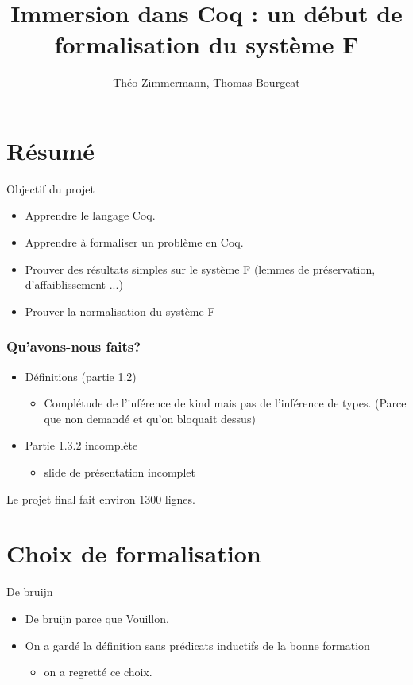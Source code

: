 \documentclass{beamer}
\begin{document}
	\title{Immersion dans Coq : un début de formalisation du système F}
	\author{Théo Zimmermann, Thomas Bourgeat}
\frame{\titlepage}
\frame{\tableofcontents}

\section{Résumé}

\begin{frame}
Objectif du projet
\begin{itemize}
\item Apprendre le langage Coq.
\pause
\item Apprendre à formaliser un problème en Coq.
\pause
\item {\scriptsize Prouver des résultats simples sur le système F (lemmes de
préservation, d'affaiblissement ...)}
\item {\tiny Prouver la normalisation du système F}
\end{itemize}


\end{frame}

    \begin{frame}
    \frametitle{Qu'avons-nous faits?}
	\begin{itemize}
	\item Définitions (partie 1.2)
	\begin{itemize}
	\item Complétude de l'inférence de kind mais pas de l'inférence
	de types. (Parce que non demandé et qu'on bloquait dessus)
	\end{itemize}
	\pause
	\item Partie 1.3.2 incomplète
	\begin{itemize}
	\item slide de présentation incomplet
	\end{itemize}
	\end{itemize}
	Le projet final fait environ 1300 lignes.
    \end{frame}
     
		
\section{Choix de formalisation}


\begin{frame}{De bruijn}
\begin{itemize}
\item De bruijn parce que Vouillon.
\pause
\item On a gardé la définition sans prédicats inductifs de la bonne
formation
\pause
\begin{itemize}
\item on a regretté ce choix.
\end{itemize}
\end{itemize}
\end{frame}
\end{document}
